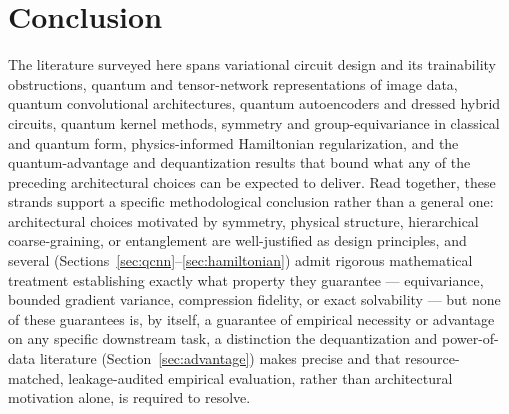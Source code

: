 \documentclass[11pt]{article}
\begin{document}
\section{Conclusion}
\label{sec:conclusion}
The literature surveyed here spans variational circuit design and its trainability obstructions, quantum and tensor-network representations of image data, quantum convolutional architectures, quantum autoencoders and dressed hybrid circuits, quantum kernel methods, symmetry and group-equivariance in classical and quantum form, physics-informed Hamiltonian regularization, and the quantum-advantage and dequantization results that bound what any of the preceding architectural choices can be expected to deliver. Read together, these strands support a specific methodological conclusion rather than a general one: architectural choices motivated by symmetry, physical structure, hierarchical coarse-graining, or entanglement are well-justified as design principles, and several (Sections~\ref{sec:qcnn}--\ref{sec:hamiltonian}) admit rigorous mathematical treatment establishing exactly what property they guarantee — equivariance, bounded gradient variance, compression fidelity, or exact solvability — but none of these guarantees is, by itself, a guarantee of empirical necessity or advantage on any specific downstream task, a distinction the dequantization and power-of-data literature (Section~\ref{sec:advantage}) makes precise and that resource-matched, leakage-audited empirical evaluation, rather than architectural motivation alone, is required to resolve.
\end{document}
